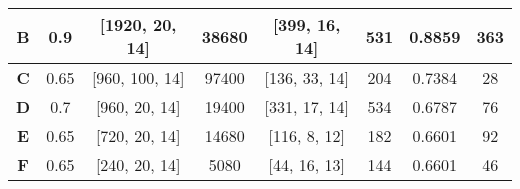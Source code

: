 \begin{table}[H]
{\begin{tabular}{|c|c|c|c|c|c|c|c|}
\textbf{B} & 0.9                                                                  & {[}1920, 20, 14{]}                                                  & 38680                                                              & {[}399, 16, 14{]}                                                  & 531                                                               & 0.8859                                                                     & 363                                                              \\ \hline
\textbf{C} & 0.65                                                                 & {[}960, 100, 14{]}                                                  & 97400                                                              & {[}136, 33, 14{]}                                                  & 204                                                               & 0.7384                                                                     & 28                                                               \\ \hline
\textbf{D} & 0.7                                                                  & {[}960, 20, 14{]}                                                   & 19400                                                              & {[}331, 17, 14{]}                                                  & 534                                                               & 0.6787                                                                     & 76                                                               \\ \hline
\textbf{E} & 0.65                                                                 & {[}720, 20, 14{]}                                                   & 14680                                                              & {[}116, 8, 12{]}                                                   & 182                                                               & 0.6601                                                                     & 92                                                               \\ \hline
\textbf{F} & 0.65                                                                 & {[}240, 20, 14{]}                                                   & 5080                                                               & {[}44, 16, 13{]}                                                   & 144                                                               & 0.6601                                                                     & 46                                                               \\ \hline
\end{tabular}}
\end{table}

